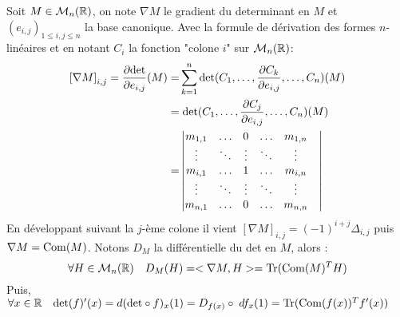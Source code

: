 \documentclass[letterpaper,10pt]{article}
\begin{document}
{Soit $M \in \mathcal{M}_n(\mathbb{R})$, on note $\nabla M$ le gradient du determinant en $M$ et $(e_{i,j})_{1\leq i, j \leq n}$ la base canonique. 
Avec la formule de dérivation des formes $n$-linéaires et en notant $C_i$ la fonction "colone $i$" sur $\mathcal{M}_n(\mathbb{R})$:\begin{align*} \left[\nabla M\right]_{i,j} = \frac{\partial \mathrm{det}}{\partial e_{i,j}}(M) =& \sum_{k=1}^n \mathrm{det}(C_1,\ldots,\frac{\partial C_k}{\partial e_{i,j}},\ldots,C_n)(M)\\
 =& \;\mathrm{det}(C_1,\ldots,\frac{\partial C_j}{\partial e_{i,j}},\ldots,C_n)(M)\\
 =& \begin{vmatrix}m_{1,1}& \ldots& 0&\ldots& m_{1,n}& \\ \vdots & \ddots & \vdots & \ddots &\vdots \\m_{i,1}& \ldots& 1& \ldots& m_{i,n}&\\ \vdots & \ddots & \vdots & \ddots &\vdots \\ m_{n,1}& \ldots& 0&\ldots & m_{n,n}& \end{vmatrix} \end{align*}
En développant suivant la $j$-ème colone il vient $\left[\nabla M\right]_{i,j} = (-1)^{i+j} \Delta_{i,j}$ puis $\nabla M = \mathrm{Com}(M)$. Notons $D_M$ la différentielle du det en $M$, alors : \[ \forall H \in \mathcal{M}_n(\mathbb{R})\quad D_M(H) = <\nabla M,H> = \mathrm{Tr(Com}(M)^TH) \]
Puis, $\forall x \in \mathbb{R} \quad \mathrm{det}(f)'(x) = d(\mathrm{det}\circ f)_x(1) = D_{f(x)}\circ\; df_x(1) = \mathrm{Tr(Com}(f(x))^Tf'(x))$
 }

\printbibliography %
\end{document}

